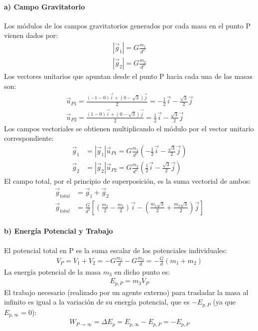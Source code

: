 \paragraph{a) Campo Gravitatorio}
Los módulos de los campos gravitatorios generados por cada masa en el punto P vienen dados por:
\begin{gather*}
    |\vec{g}_1| = G\frac{m_1}{d^2} \\
    |\vec{g}_2| = G\frac{m_2}{d^2}
\end{gather*}
Los vectores unitarios que apuntan desde el punto P hacia cada una de las masas son:
\begin{gather*}
    \vec{u}_{P1} = \frac{(-1-0)\vec{i} + (0-\sqrt{3})\vec{j}}{2} = -\frac{1}{2}\vec{i} - \frac{\sqrt{3}}{2}\vec{j} \\
    \vec{u}_{P2} = \frac{(1-0)\vec{i} + (0-\sqrt{3})\vec{j}}{2} = \frac{1}{2}\vec{i} - \frac{\sqrt{3}}{2}\vec{j}
\end{gather*}
Los campos vectoriales se obtienen multiplicando el módulo por el vector unitario correspondiente:
\begin{align*}
    \vec{g}_1 &= |\vec{g}_1|\vec{u}_{P1} = G\frac{m_1}{d^2}\left(-\frac{1}{2}\vec{i} - \frac{\sqrt{3}}{2}\vec{j}\right) \\
    \vec{g}_2 &= |\vec{g}_2|\vec{u}_{P2} = G\frac{m_2}{d^2}\left(\frac{1}{2}\vec{i} - \frac{\sqrt{3}}{2}\vec{j}\right)
\end{align*}
El campo total, por el principio de superposición, es la suma vectorial de ambos:
\begin{align*}
    \vec{g}_{total} &= \vec{g}_1 + \vec{g}_2 \\
    \vec{g}_{total} &= \frac{G}{d^2}\left[ \left(\frac{m_2}{2}-\frac{m_1}{2}\right)\vec{i} - \left(\frac{m_1\sqrt{3}}{2}+\frac{m_2\sqrt{3}}{2}\right)\vec{j} \right]
\end{align*}

\paragraph{b) Energía Potencial y Trabajo}
El potencial total en P es la suma escalar de los potenciales individuales:
\begin{gather*}
    V_P = V_1 + V_2 = -G\frac{m_1}{d} - G\frac{m_2}{d} = -\frac{G}{d}(m_1+m_2)
\end{gather*}
La energía potencial de la masa $m_3$ en dicho punto es:
\begin{gather*}
    E_{p,P} = m_3 V_P
\end{gather*}
El trabajo necesario (realizado por un agente externo) para trasladar la masa al infinito es igual a la variación de su energía potencial, que es $-E_{p,P}$ (ya que $E_{p,\infty}=0$):
\begin{gather*}
    W_{P \to \infty} = \Delta E_p = E_{p,\infty} - E_{p,P} = -E_{p,P}
\end{gather*}


